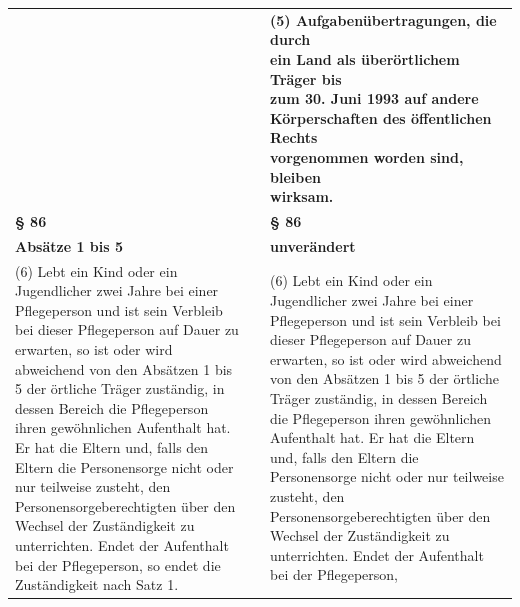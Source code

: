 \documentclass[10pt,a4paper,landscape]{article}
\begin{document}
\begin{longtable}{|L{8.2cm}|L{8.2cm}|L{8.2cm}|}
\hhline{|---|}
 &  & \textbf{\textcolor{diffgreen}{(5) Aufgabenübertragungen, die durch  \newline ein Land als überörtlichem Träger bis  \newline zum 30. Juni 1993 auf andere  \newline Körperschaften des öffentlichen Rechts  \newline vorgenommen worden sind, bleiben  \newline wirksam.}} \\
\hhline{|---|}
\textbf{\S{} 86} &  & \textbf{\S{} 86} \\
\hhline{|---|}
\textbf{Absätze 1 bis 5} &  & \textbf{unverändert} \\
\hhline{|---|}
(6) Lebt ein Kind oder ein Jugendlicher  \newline zwei Jahre bei einer Pflegeperson und ist  \newline sein Verbleib bei dieser Pflegeperson auf  \newline Dauer zu erwarten, so ist oder wird  \newline abweichend von den Absätzen 1 bis 5 der  \newline örtliche Träger zuständig, in dessen  \newline Bereich die Pflegeperson ihren  \newline gewöhnlichen Aufenthalt hat. Er hat die  \newline Eltern und, falls den Eltern die  \newline Personensorge nicht oder nur teilweise  \newline zusteht, den Personensorgeberechtigten  \newline über den Wechsel der Zuständigkeit zu  \newline unterrichten. Endet der Aufenthalt bei der  \newline Pflegeperson, so endet die Zuständigkeit  \newline nach Satz 1. &  & (6) Lebt ein Kind oder ein Jugendlicher  \newline zwei Jahre bei einer Pflegeperson und ist  \newline sein Verbleib bei dieser Pflegeperson auf  \newline Dauer zu erwarten, so ist oder wird  \newline abweichend von den Absätzen 1 bis 5 der  \newline örtliche Träger zuständig, in dessen  \newline Bereich die Pflegeperson ihren  \newline gewöhnlichen Aufenthalt hat. Er hat die  \newline Eltern und, falls den Eltern die  \newline Personensorge nicht oder nur teilweise  \newline zusteht, den Personensorgeberechtigten  \newline über den Wechsel der Zuständigkeit zu  \newline unterrichten. Endet der Aufenthalt bei der  \newline Pflegeperson, 
\end{longtable}
\end{document}
